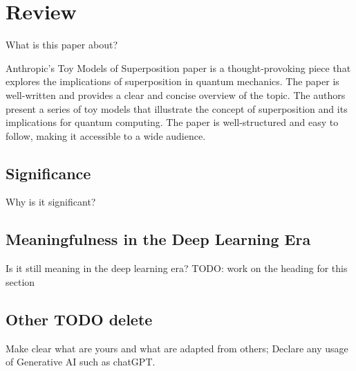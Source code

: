 \section{Review}
\label{sec:review}

What is this paper about?


Anthropic's Toy Models of Superposition paper \cite{elhage2022toy} is a thought-provoking piece that explores the implications of superposition in quantum mechanics. The paper is well-written and provides a clear and concise overview of the topic. The authors present a series of toy models that illustrate the concept of superposition and its implications for quantum computing. The paper is well-structured and easy to follow, making it accessible to a wide audience.

\subsection{Significance}

Why is it significant?

\subsection{Meaningfulness in the Deep Learning Era}

Is it still meaning in the deep learning era?
TODO: work on the heading for this section

\subsection{Other TODO delete}

Make clear what are yours and what are adapted from others;
Declare any usage of Generative AI such as chatGPT.
